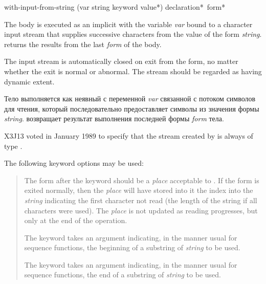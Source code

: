 \begin{defmac}
with-input-from-string (var string {keyword value}*)
      {declaration}* {\,form}*

The body is executed as an implicit  with the variable \emph{var}
bound to a character input stream that supplies successive characters from
the value of the form \emph{string}.  
returns the results from the last \emph{form} of the body.

The input stream is automatically closed on exit from
the  form,
no matter whether the exit is normal or abnormal.
The stream should be regarded as having dynamic extent.

Тело выполняется как неявный  с переменной \emph{var} связанной с
потоком символов для чтения, который последовательно предоставляет символы из
значения формы \emph{string}.  возвращает результат
выполнения последней формы \emph{form} тела.

\begin{new}
X3J13 voted in January 1989
to specify that the stream created by
 is always of type .
\end{new}

The following keyword options may be used:
\begin{quotation}
\begin{flushdesc}
\item[\cd{:index}]
The form after the  keyword should be a \emph{place}
acceptable to .  If the  form
is exited normally, then the \emph{place} will have stored into it the
index into the \emph{string} indicating the first character not read
(the length of the string if all characters were used).
The \emph{place} is not updated as reading progresses, but only at the
end of the operation. 

\item[\cd{:start}]
The  keyword takes an argument indicating, in the manner
usual for sequence functions, the beginning of
a substring of \emph{string} to be used.

\item[\cd{:end}]
The  keyword takes an argument indicating, in the manner
usual for sequence functions, the end of
a substring of \emph{string} to be used.
\end{flushdesc}
\end{quotation}


\end{defmac}
